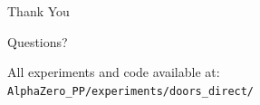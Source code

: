 \documentclass[aspectratio=169, 10pt]{beamer}
\begin{document}
\begin{frame}{}
\centering
\vspace{2cm}
{\Huge Thank You}

\vspace{1cm}
{\Large Questions?}

\vspace{1.5cm}
{\small All experiments and code available at:\\
\texttt{AlphaZero\_PP/experiments/doors\_direct/}}
\end{frame}
\end{document}
